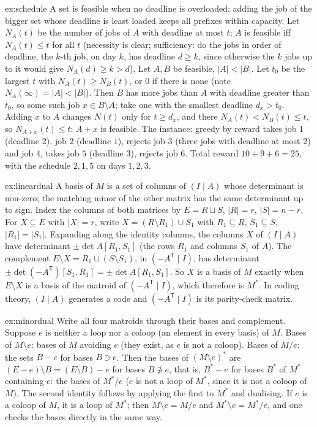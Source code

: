 \begin{solution}{ex:schedule}
\idea A set is feasible when no deadline is overloaded; adding the job of the bigger set whose deadline is least loaded keeps all prefixes within capacity.
\writeup Let $N_A(t)$ be the number of jobs of $A$ with deadline at most $t$; $A$ is feasible iff $N_A(t)\le t$ for all $t$ (necessity is clear; sufficiency: do the jobs in order of deadline, the $k$-th job, on day $k$, has
deadline $d\ge k$, since otherwise the $k$ jobs up to it would give $N_A(d)\ge k>d$). Let $A,B$ be feasible, $|A|<|B|$. Let $t_0$ be the largest
$t$ with $N_A(t)\ge N_B(t)$, or $0$ if there is none (note $N_A(\infty)=|A|<|B|$). Then $B$ has more jobs than $A$ with deadline greater than $t_0$, so some such job $x\in B\setminus A$; take one with the smallest deadline
$d_x>t_0$. Adding $x$ to $A$ changes $N(t)$ only for $t\ge d_x$, and there $N_A(t)<N_B(t)\le t$, so $N_{A+x}(t)\le t$: $A+x$ is feasible.
The instance: greedy by reward takes job $1$ (deadline $2$), job $2$ (deadline $1$), rejects job $3$ (three jobs with deadline at most $2$) and job $4$, takes job $5$ (deadline $3$), rejects job $6$. Total reward $10+9+6=25$, with the
schedule $2,1,5$ on days $1,2,3$.
\end{solution}

\begin{solution}{ex:lineardual}
\idea A basis of $M$ is a set of columns of $(I\mid A)$ whose determinant is non-zero; the matching minor of the other matrix has the same determinant up to sign.
\writeup Index the columns of both matrices by $E=R\sqcup S$, $|R|=r$, $|S|=n-r$. For $X\subseteq E$ with $|X|=r$, write $X=(R\setminus R_1)\cup S_1$ with $R_1\subseteq R$, $S_1\subseteq S$, $|R_1|=|S_1|$. Expanding along the identity
columns, the columns $X$ of $(I\mid A)$ have determinant $\pm\det A[R_1,S_1]$ (the rows $R_1$ and columns $S_1$ of $A$). The complement $E\setminus X=R_1\cup(S\setminus S_1)$, in $(-A^{\mathsf T}\mid I)$, has determinant
$\pm\det(-A^{\mathsf T})[S_1,R_1]=\pm\det A[R_1,S_1]$. So $X$ is a basis of $M$ exactly when $E\setminus X$ is a basis of the matroid of $(-A^{\mathsf T}\mid I)$, which therefore is $M^*$. In coding theory, $(I\mid A)$
generates a code and $(-A^{\mathsf T}\mid I)$ is its parity-check matrix.
\end{solution}

\begin{solution}{ex:minordual}
\idea Write all four matroids through their bases and complement.
\writeup Suppose $e$ is neither a loop nor a coloop (an element in every basis) of $M$. Bases of $M\setminus e$: bases of $M$ avoiding $e$ (they exist, as $e$ is not a coloop). Bases of $M/e$: the sets $B-e$ for bases $B\ni e$.
Then the bases of $(M\setminus e)^*$ are $(E-e)\setminus B=(E\setminus B)-e$ for bases $B\not\ni e$, that is, $B^*-e$ for bases $B^*$ of $M^*$ containing $e$: the bases of $M^*/e$ ($e$ is not a loop of $M^*$, since it is not a
coloop of $M$). The second identity follows by applying the first to $M^*$ and dualising. If $e$ is a coloop of $M$, it is a loop of $M^*$; then $M\setminus e=M/e$ and $M^*\setminus e=M^*/e$, and one checks the bases
directly in the same way.
\end{solution}

